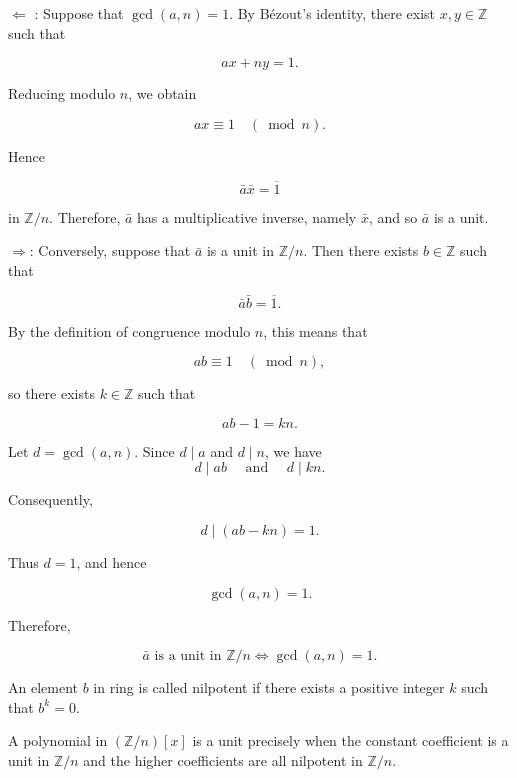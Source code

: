 \begin{formalproof}
 
\(\Leftarrow\) : Suppose that \(\operatorname{gcd}(a, n)=1\).
By Bézout's identity, there exist \(x, y \in \mathbb{Z}\) such that

\[
a x+n y=1 .
\]

Reducing modulo \(n\), we obtain

\[
a x \equiv 1 \quad(\bmod n) .
\]

Hence

\[
\bar{a} \bar{x}=\overline{1}
\]

in \(\mathbb{Z} / n\). Therefore, \(\bar{a}\) has a multiplicative inverse, namely \(\bar{x}\), and so \(\bar{a}\) is a unit.

\(\Rightarrow\): Conversely, suppose that \(\bar{a}\) is a unit in \(\mathbb{Z} / n\).
Then there exists \(b \in \mathbb{Z}\) such that

\[
\bar{a} \bar{b}=\overline{1} .
\]

By the definition of congruence modulo \(n\), this means that

\[
a b \equiv 1 \quad(\bmod n),
\]

so there exists \(k \in \mathbb{Z}\) such that

\[
a b-1=k n .
\]

Let \(d=\operatorname{gcd}(a, n)\). Since \(d \mid a\) and \(d \mid n\), we have
\[
d \mid a b \quad \text { and } \quad d \mid k n .
\]

Consequently,

\[
d \mid(a b-k n)=1 .
\]

Thus \(d=1\), and hence

\[
\operatorname{gcd}(a, n)=1 .
\]

Therefore,

\[
\bar{a} \text { is a unit in } \mathbb{Z} / n \Longleftrightarrow \operatorname{gcd}(a, n)=1 .
\]


\end{formalproof}

\begin{definition}[Nilpotent]
An element \(b\) in ring is called nilpotent if there exists a positive integer \(k\) such that \(b^k=0\).
\end{definition}

\begin{proposition}
  A polynomial in \((\mathbb{Z} / n)[x]\) is a unit precisely when the constant coefficient is a unit in \(\mathbb{Z} / n\) and the higher coefficients are all nilpotent in \(\mathbb{Z} / n\).
\end{proposition}

